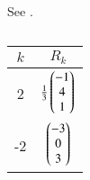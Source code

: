 See 
.
\begin{table}[H]
\centering
\caption{}
\label{tab:chapters/12/10/2/15/}
\begin{tabular}{|c|c|}
\hline
$k$ & $R_k$ \\
\hline
2 & $\frac{1}{3}\begin{pmatrix}-1 \\ 4 \\ 1\end{pmatrix}$ \\
\hline
-2 & $\begin{pmatrix}-3 \\ 0 \\ 3\end{pmatrix}$ \\
\hline
\end{tabular}
\end{table}
